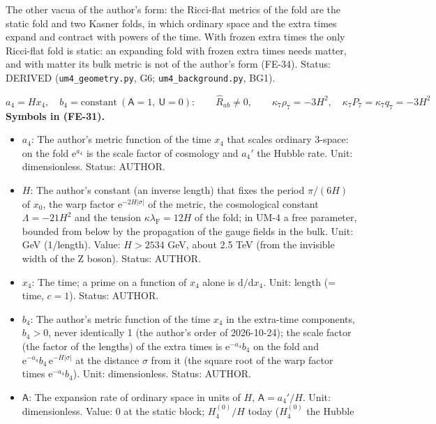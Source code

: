 \documentclass[
  10pt,
]{article}
\providecommand{\tightlist}{%
  \setlength{\itemsep}{0pt}\setlength{\parskip}{0pt}}
\begin{document}
The other vacua of the author's form: the Ricci-flat metrics of the fold
are the static fold and two Kasner folds, in which ordinary space and
the extra times expand and contract with powers of the time. With frozen
extra times the only Ricci-flat fold is static: an expanding fold with
frozen extra times needs matter, and with matter its bulk metric is not
of the author's form (FE-34). Status: DERIVED
(\texttt{um4\_geometry.py}, G6; \texttt{um4\_background.py}, BG1).

\[
a_4 = Hx_4,\quad b_4 = \text{constant}\ (\mathsf{A} = 1,\ \mathsf{U} = 0):\qquad
\hat R_{ab} \ne 0,\qquad \kappa_7\rho_7 = -3H^2,\quad \kappa_7P_7 = \kappa_7q_7 = -3H^2 \tag{FE-31}
\] \textbf{Symbols in (FE-31).}

\begin{itemize}
\tightlist
\item
  \(a_4\): The author's metric function of the time \(x_4\) that scales
  ordinary 3-space: on the fold \(\mathrm{e}^{a_4}\) is the scale factor
  of cosmology and \(a_4'\) the Hubble rate. Unit: dimensionless.
  Status: AUTHOR.
\item
  \(H\): The author's constant (an inverse length) that fixes the period
  \(\pi/(6H)\) of \(x_0\), the warp factor
  \(\mathrm{e}^{-2H\lvert\sigma\rvert}\) of the metric, the cosmological
  constant \(\Lambda = -21H^2\) and the tension
  \(\kappa\lambda_{\mathrm{F}} = 12H\) of the fold; in UM-4 a free
  parameter, bounded from below by the propagation of the gauge fields
  in the bulk. Unit: GeV (1/length). Value: \(H > 2534\) GeV, about 2.5
  TeV (from the invisible width of the Z boson). Status: AUTHOR.
\item
  \(x_4\): The time; a prime on a function of \(x_4\) alone is
  \(\mathrm{d}/\mathrm{d}x_4\). Unit: length (= time, \(c = 1\)).
  Status: AUTHOR.
\item
  \(b_4\): The author's metric function of the time \(x_4\) in the
  extra-time components, \(b_4 > 0\), never identically 1 (the author's
  order of 2026-10-24); the scale factor (the factor of the lengths) of
  the extra times is \(\mathrm{e}^{-a_4}b_4\) on the fold and
  \(\mathrm{e}^{-a_4}b_4\,\mathrm{e}^{-H\lvert\sigma\rvert}\) at the
  distance \(\sigma\) from it (the square root of the warp factor times
  \(\mathrm{e}^{-a_4}b_4\)). Unit: dimensionless. Status: AUTHOR.
\item
  \(\mathsf{A}\): The expansion rate of ordinary space in units of
  \(H\), \(\mathsf{A} = a_4'/H\). Unit: dimensionless. Value: 0 at the
  static block; \(H_4^{(0)}/H\) today (\(H_4^{(0)}\) the Hubble

\end{itemize}
\end{document}
